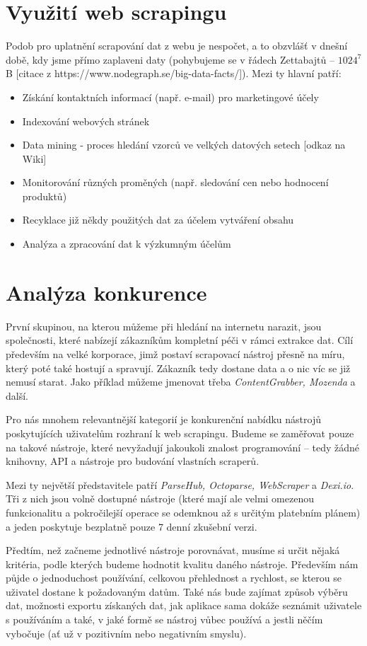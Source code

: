 \documentclass[thesis=B,czech]{FITthesis}[2012/06/26]
\begin{document}
\section{Využití web scrapingu}
Podob pro uplatnění scrapování dat z webu je nespočet, a to obzvláš\v{t} v dnešní době, kdy jsme přímo zaplaveni daty (pohybujeme se v řádech Zettabajtů -- $1024^{7}$ B [citace z https://www.nodegraph.se/big-data-facts/]). Mezi ty hlavní patří:
\begin{itemize}
	\item Získání kontaktních informací (např. e-mail) pro marketingové účely
	\item Indexování webových stránek
	\item Data mining - proces hledání vzorců ve velkých datových setech [odkaz na Wiki]
	\item Monitorování různých proměných (např. sledování cen nebo hodnocení produktů)
	\item Recyklace již někdy použitých dat za účelem vytváření  obsahu
	\item Analýza a zpracování dat k výzkumným účelům
\end{itemize}


\newpage
\section{Analýza konkurence}
První skupinou, na kterou můžeme při hledání na internetu narazit, jsou společnosti, které nabízejí zákazníkům kompletní péči v rámci extrakce dat. Cílí především na velké korporace, jimž postaví scrapovací nástroj přesně na míru, který poté také hostují a spravují. Zákazník tedy dostane data a o nic víc se již nemusí starat. Jako příklad můžeme jmenovat třeba \emph{ContentGrabber, Mozenda} a další.

Pro nás mnohem relevantnější kategorií je konkurenční nabídku nástrojů poskytujících uživatelům rozhraní k web scrapingu. Budeme se zaměřovat pouze na takové nástroje, které nevyžadují jakoukoli znalost programování -- tedy žádné knihovny, API a nástroje pro budování vlastních scraperů.

Mezi ty největší představitele patří \emph{ParseHub, Octoparse, WebScraper} a \emph{Dexi.io}. Tři z nich jsou volně dostupné nástroje (které mají ale velmi omezenou funkcionalitu a pokročilejší operace se odemknou až s určitým platebním plánem) a jeden poskytuje bezplatně pouze 7 denní zkušební verzi.

Předtím, než začneme jednotlivé nástroje porovnávat, musíme si určit nějaká kritéria, podle kterých budeme hodnotit kvalitu daného nástroje. Především nám půjde o jednoduchost používání, celkovou přehlednost a rychlost, se kterou se uživatel dostane k požadovaným datům. Také nás bude zajímat způsob výběru dat, možnosti exportu získaných dat, jak aplikace sama dokáže seznámit uživatele s používáním a také, v jaké formě se nástroj vůbec používá a jestli něčím vybočuje (a\v{t} už v pozitivním nebo negativním smyslu). 
\end{document}
